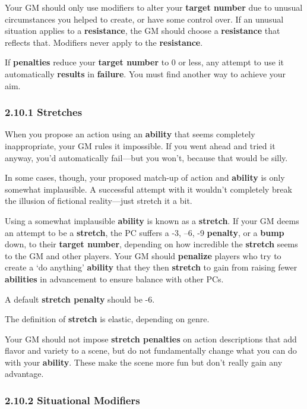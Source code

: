 \documentclass[
]{article}
\begin{document}
Your GM should only use modifiers to alter your \textbf{target number}
due to unusual circumstances you helped to create, or have some control
over. If an unusual situation applies to a \textbf{resistance}, the GM
should choose a \textbf{resistance} that reflects that. Modifiers never
apply to the \textbf{resistance}.

If \textbf{penalties} reduce your \textbf{target number} to 0 or less,
any attempt to use it automatically \textbf{results} in
\textbf{failure}. You must find another way to achieve your aim.

\hypertarget{stretches}{%
\subsubsection{2.10.1 Stretches}\label{stretches}}

When you propose an action using an \textbf{ability} that seems
completely inappropriate, your GM rules it impossible. If you went ahead
and tried it anyway, you'd automatically fail---but you won't, because
that would be silly.

In some cases, though, your proposed match-up of action and
\textbf{ability} is only somewhat implausible. A successful attempt with
it wouldn't completely break the illusion of fictional reality---just
stretch it a bit.

Using a somewhat implausible \textbf{ability} is known as a
\textbf{stretch}. If your GM deems an attempt to be a \textbf{stretch},
the PC suffers a -3, --6, -9 \textbf{penalty}, or a \textbf{bump} down,
to their \textbf{target number}, depending on how incredible the
\textbf{stretch} seems to the GM and other players. Your GM should
\textbf{penalize} players who try to create a `do anything'
\textbf{ability} that they then \textbf{stretch} to gain from raising
fewer \textbf{abilities} in advancement to ensure balance with other
PCs.

A default \textbf{stretch penalty} should be -6.

The definition of \textbf{stretch} is elastic, depending on genre.

Your GM should not impose \textbf{stretch penalties} on action
descriptions that add flavor and variety to a scene, but do not
fundamentally change what you can do with your \textbf{ability}. These
make the scene more fun but don't really gain any advantage.

\hypertarget{situational-modifiers}{%
\subsubsection{2.10.2 Situational
Modifiers}\label{situational-modifiers}}
\end{document}
